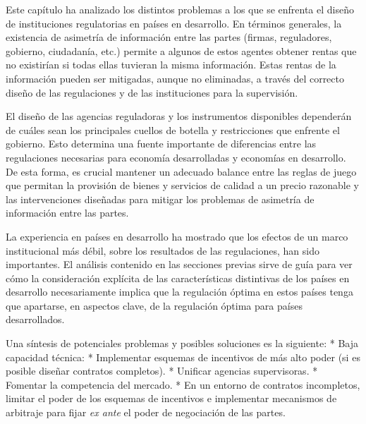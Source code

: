 \documentclass[
  12pt,
  spanish,
]{book}
\begin{document}
Este capítulo ha analizado los distintos problemas a los que se enfrenta el diseño de instituciones regulatorias en países en desarrollo. En términos generales, la existencia de asimetría de información entre las partes (firmas, reguladores, gobierno, ciudadanía, etc.) permite a algunos de estos agentes obtener rentas que no existirían si todas ellas tuvieran la misma información. Estas rentas de la información pueden ser mitigadas, aunque no eliminadas, a través del correcto diseño de las regulaciones y de las instituciones para la supervisión.

El diseño de las agencias reguladoras y los instrumentos disponibles dependerán de cuáles sean los principales cuellos de botella y restricciones que enfrente el gobierno. Esto determina una fuente importante de diferencias entre las regulaciones necesarias para economía desarrolladas y economías en desarrollo. De esta forma, es crucial mantener un adecuado balance entre las reglas de juego que permitan la provisión de bienes y servicios de calidad a un precio razonable y las intervenciones diseñadas para mitigar los problemas de asimetría de información entre las partes.

La experiencia en países en desarrollo ha mostrado que los efectos de un marco institucional más débil, sobre los resultados de las regulaciones, han sido importantes. El análisis contenido en las secciones previas sirve de guía para ver cómo la consideración explícita de las características distintivas de los países en desarrollo necesariamente implica que la regulación óptima en estos países tenga que apartarse, en aspectos clave, de la regulación óptima para países desarrollados.

Una síntesis de potenciales problemas y posibles soluciones es la siguiente:
* Baja capacidad técnica:
* Implementar esquemas de incentivos de más alto poder (si es posible diseñar contratos completos).
* Unificar agencias supervisoras.
* Fomentar la competencia del mercado.
* En un entorno de contratos incompletos, limitar el poder de los esquemas de incentivos e implementar mecanismos de arbitraje para fijar \emph{ex ante} el poder de negociación de las partes.
\end{document}

